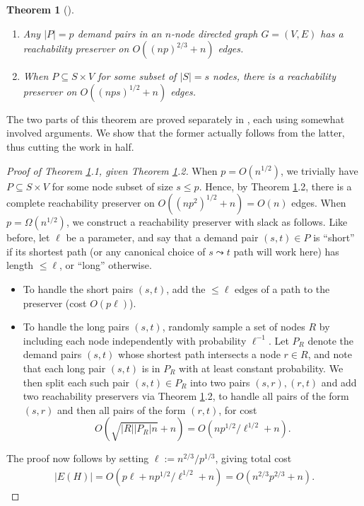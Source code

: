 \documentclass{article}
\newtheorem{theorem}{Theorem}
\begin{document}
\begin{theorem} [\cite{AB18}] \label{thm:reachubs} ~
\begin{enumerate}
\item Any $|P|=p$ demand pairs in an $n$-node directed graph $G = (V, E)$ has a reachability preserver on $O((np)^{2/3} + n)$ edges.

\item When $P \subseteq S \times V$ for some subset of $|S|=s$ nodes, there is a reachability preserver on $O((nps)^{1/2} + n)$ edges.
\end{enumerate}
\end{theorem}

The two parts of this theorem are proved separately in \cite{AB18}, each using somewhat involved arguments.
We show that the former actually follows from the latter, thus cutting the work in half.
\begin{proof} [Proof of Theorem \ref{thm:reachubs}.1, given Theorem \ref{thm:reachubs}.2]

When $p = O(n^{1/2})$, we trivially have $P \subseteq S \times V$ for some node subset of size $s \le p$.
Hence, by Theorem \ref{thm:reachubs}.2, there is a complete reachability preserver on $O((np^2)^{1/2} + n) = O(n)$ edges.
When $p = \Omega(n^{1/2})$, we construct a reachability preserver with slack as follows.
Like before, let $\ell$ be a parameter, and say that a demand pair $(s, t) \in P$ is ``short'' if its shortest path (or any canonical choice of $s \leadsto t$ path will work here) has length $\le \ell$, or ``long'' otherwise.
\begin{itemize}
\item To handle the short pairs $(s, t)$, add the $\le \ell$ edges of a path to the preserver (cost $O(p \ell)$).

\item To handle the long pairs $(s, t)$, randomly sample a set of nodes $R$ by including each node independently with probability $\ell^{-1}$.
Let $P_R$ denote the demand pairs $(s, t)$ whose shortest path intersects a node $r \in R$, and note that each long pair $(s, t)$ is in $P_R$ with at least constant probability.
We then split each such pair $(s, t) \in P_R$ into two pairs $(s, r), (r, t)$ and add two reachability preservers via Theorem \ref{thm:reachubs}.2, to handle all pairs of the form $(s, r)$ and then all pairs of the form $(r, t)$, for cost
$$O\left(\sqrt{|R||P_R|n} + n\right) = O\left(np^{1/2} / \ell^{1/2} + n\right).$$
\end{itemize}
The proof now follows by setting $\ell := n^{2/3} / p^{1/3}$, giving total cost
\begin{align*}
|E(H)| = O\left(p\ell + np^{1/2}/\ell^{1/2} + n\right) = O\left(n^{2/3} p^{2/3} + n\right). \tag*{\qedhere}
\end{align*}
\end{proof}
\end{document}
